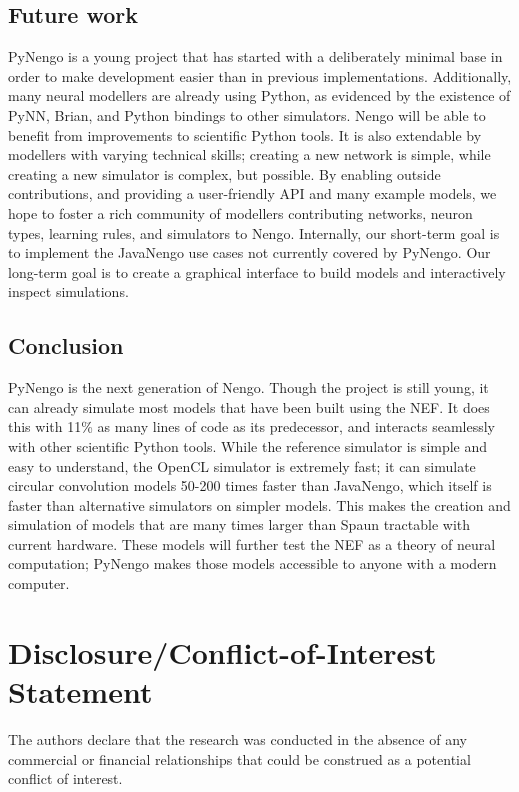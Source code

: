 \documentclass{frontiersSCNS}
\begin{document}
\subsection{Future work}

PyNengo is a young project that
has started with a deliberately minimal base
in order to make development easier than in
previous implementations.
Additionally, many neural modellers
are already using Python,
as evidenced by the existence of
PyNN, Brian, and Python bindings to other simulators.
Nengo will be able to benefit
from improvements to scientific Python tools.
It is also extendable by modellers with
varying technical skills;
creating a new network is simple,
while creating a new simulator is complex, but possible.
By enabling outside contributions,
and providing a user-friendly API
and many example models,
we hope to foster a rich community of modellers
contributing networks, neuron types, learning rules,
and simulators to Nengo.
Internally, our short-term goal
is to implement the JavaNengo use cases
not currently covered by PyNengo.
Our long-term goal is to
create a graphical interface
to build models and
interactively inspect simulations.

\subsection{Conclusion}

PyNengo is the next generation of Nengo.
Though the project is still young,
it can already simulate most models
that have been built using the NEF.
It does this with 11\% as many lines of code
as its predecessor,
and interacts seamlessly with
other scientific Python tools.
While the reference simulator
is simple and easy to understand,
the OpenCL simulator is extremely fast;
it can simulate circular convolution models
50-200 times faster than JavaNengo,
which itself is faster than alternative simulators
on simpler models.
This makes the creation and simulation
of models that are many times larger than Spaun
tractable with current hardware.
These models will further test
the NEF as a theory of neural computation;
PyNengo makes those models
accessible to anyone with
a modern computer.

\section*{Disclosure/Conflict-of-Interest Statement}

The authors declare that the research was conducted in the absence of
any commercial or financial relationships that could be construed as a
potential conflict of interest.
\end{document}
